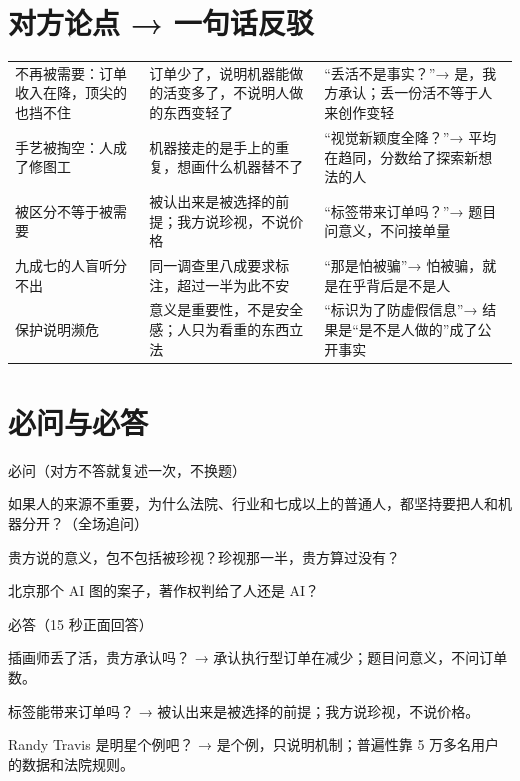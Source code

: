 \documentclass[quick,pro]{debate}
\begin{document}
\section{对方论点 → 一句话反驳}
\begin{tabularx}{\linewidth}{@{}Y Y Y@{}}\toprule
{}&&\\\midrule
不再被需要：订单收入在降，顶尖的也挡不住&订单少了，说明机器能做的活变多了，不说明人做的东西变轻了&“丢活不是事实？”→ 是，我方承认；丢一份活不等于人来创作变轻\\
手艺被掏空：人成了修图工&机器接走的是手上的重复，想画什么机器替不了&“视觉新颖度全降？”→ 平均在趋同，分数给了探索新想法的人\\
被区分不等于被需要&被认出来是被选择的前提；我方说珍视，不说价格&“标签带来订单吗？”→ 题目问意义，不问接单量\\
九成七的人盲听分不出&同一调查里八成要求标注，超过一半为此不安&“那是怕被骗”→ 怕被骗，就是在乎背后是不是人\\
保护说明濒危&意义是重要性，不是安全感；人只为看重的东西立法&“标识为了防虚假信息”→ 结果是“是不是人做的”成了公开事实\\
\bottomrule\end{tabularx}

\section{必问与必答}
\begin{points}{必问（对方不答就复述一次，不换题）}
\item 如果人的来源不重要，为什么法院、行业和七成以上的普通人，都坚持要把人和机器分开？（全场追问）
\item 贵方说的意义，包不包括被珍视？珍视那一半，贵方算过没有？
\item 北京那个 AI 图的案子，著作权判给了人还是 AI？
\end{points}
\begin{points}{必答（15 秒正面回答）}
\item 插画师丢了活，贵方承认吗？ → 承认执行型订单在减少；题目问意义，不问订单数。
\item 标签能带来订单吗？ → 被认出来是被选择的前提；我方说珍视，不说价格。
\item Randy Travis 是明星个例吧？ → 是个例，只说明机制；普遍性靠 5 万多名用户的数据和法院规则。
\end{points}
\end{document}
